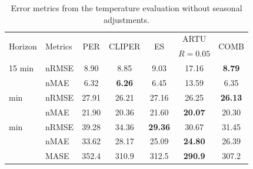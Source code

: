\begin{table}[tb]
    \centering
    \begin{tabular}{@{}llccccc@{}}
        \toprule
        \multirow{2}{*}{Horizon} & \multirow{2}{*}{Metrics} & \multirow{2}{*}{PER} & \multirow{2}{*}{CLIPER} & \multirow{2}{*}{ES} &      ARTU      & \multirow{2}{*}{COMB} \\
                                 &                          &                       &                           &                     &   $R=0.05$   &                       \\ \midrule
        15 min                   & nRMSE                    &         8.90          &           8.85            &        9.03         &     17.16      &     \textbf{8.79}     \\ 
                                 & nMAE                     &         6.32          &       \textbf{6.26}       &        6.45         &     13.59      &         6.35          \\ \addlinespace
        75 min                   & nRMSE                    &         27.91         &           26.21           &        27.16        &     26.25      &    \textbf{26.13}     \\ 
                                 & nMAE                     &         21.90         &           20.36           &        21.60        & \textbf{20.07} &         20.30         \\ \addlinespace
        150 min                  & nRMSE                    &         39.28         &           34.36           &   \textbf{29.36}    &     30.67      &         31.45         \\ 
                                 & nMAE                     &         33.62         &           28.17           &        25.09        & \textbf{24.80} &         26.39         \\ \addlinespace
                                 & MASE                     &         352.4         &           310.9           &        312.5        & \textbf{290.9} &         307.2         \\ \bottomrule
    \end{tabular}
    \caption{Error metrics from the temperature evaluation without seasonal adjustments.}
    \label{tab:5}
\end{table}



